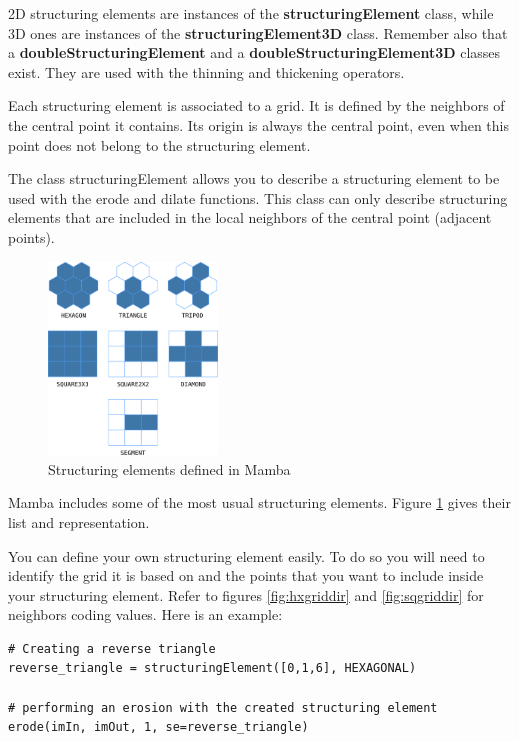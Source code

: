 \documentclass[a4paper,10pt,oneside]{article}
\begin{document}
\label{cha:structelem}
2D structuring elements are instances of the \textbf{structuringElement} class,
while 3D ones are instances of the \textbf{structuringElement3D}
class. Remember also that a \textbf{doubleStructuringElement} and a
\textbf{doubleStructuringElement3D} classes exist. They are used with
the thinning and thickening operators.

Each structuring element is associated to a grid. It is defined by the neighbors
of the central point it contains. Its origin is always
the central point, even when this point does not belong to the structuring element.

The class structuringElement allows you to describe a structuring element to
be used with the erode and dilate functions. This class can only describe
structuring elements that are included in the local 
neighbors of the central point (adjacent points).

\begin{figure}
\centering
\includegraphics[width=0.4\textwidth]{figures/se.pdf}
\caption{Structuring elements defined in Mamba}
\label{fig:se}
\end{figure}

Mamba includes some of the most usual structuring elements. Figure
\ref{fig:se} gives their list and representation.

You can define your own structuring element easily. To do so you will need to
identify the grid it is based on and the points that you want to include 
inside your structuring element. Refer to figures \ref{fig:hxgriddir} and 
\ref{fig:sqgriddir} for neighbors coding values. Here is an example:

\lstset{language=Python}
\begin{lstlisting}
# Creating a reverse triangle
reverse_triangle = structuringElement([0,1,6], HEXAGONAL)

# performing an erosion with the created structuring element
erode(imIn, imOut, 1, se=reverse_triangle)
\end{lstlisting}
\end{document}
